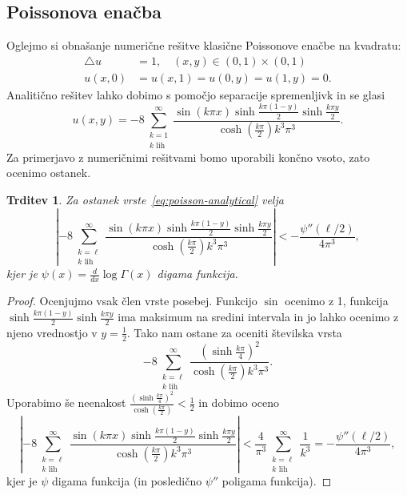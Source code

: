 \documentclass[12pt,a4paper,twoside]{article}
\theoremstyle{definition} %
\theoremstyle{plain} %
\newtheorem{trditev}[definicija]{Trditev}
\numberwithin{equation}{section}
\newcommand{\lap}{\triangle}
\newcommand{\dd}[2]{\ensuremath{\frac{d #1}{d #2}}}
\newcommand{\ddx}[1]{\dd{#1}{x}}
\begin{document}
\subsection{Poissonova enačba}
Oglejmo si obnašanje numerične rešitve klasične Poissonove enačbe na kvadratu:
\begin{align}
  \lap u &= 1, \quad (x, y) \in (0, 1) \times (0, 1)
  \label{eq:poisson-problem} \\
  u(x, 0) &= u(x, 1) = u(0, y) = u(1, y) = 0. \nonumber
\end{align}
Analitično rešitev lahko dobimo s pomočjo separacije spremenljivk in se glasi
\begin{equation}
  u(x, y) =
  -8 \sum_{\substack{k=1 \\ k \text{ lih}}}^\infty \frac{ \sin (k \pi  x) \sinh
  \frac{k \pi  (1-y)}{2} \sinh \frac{k \pi
y}{2}}{\cosh(\frac{k\pi}{2})k^3 \pi ^3}.
  \label{eq:poisson-analytical}
\end{equation}
Za primerjavo z numeričnimi rešitvami bomo uporabili končno vsoto, zato ocenimo
ostanek.
\begin{trditev}
  Za ostanek vrste~\eqref{eq:poisson-analytical} velja
  \[
    \left|-8 \sum_{\substack{k=\ell \\ k \text{ lih}}}^\infty \frac{ \sin (k \pi  x) \sinh
      \frac{k \pi  (1-y)}{2} \sinh \frac{k \pi y}{2}}{\cosh(\frac{k\pi}{2})k^3
      \pi ^3}\right| < -\frac{\psi''(\ell/2)}{4 \pi^3},
  \]
  kjer je $\psi(x) = \ddx{}\log\Gamma(x)$ digama funkcija.
\end{trditev}
\begin{proof}
Ocenjujmo vsak člen vrste posebej. Funkcijo $\sin$ ocenimo z 1, funkcija
$\sinh \frac{k \pi  (1-y)}{2} \sinh \frac{k \pi y}{2}$ ima maksimum na sredini
intervala in jo lahko ocenimo z njeno vrednostjo v $y = \frac{1}{2}$.
Tako nam ostane za oceniti številska vrsta
\[
    -8 \sum_{\substack{k=\ell \\ k \text{ lih}}}^\infty
    \frac{\left(\sinh\frac{k \pi}{4}\right)^2}{\cosh(\frac{k\pi}{2})k^3
    \pi ^3} .
\]
Uporabimo še neenakost $\frac{\left(\sinh\frac{k
\pi}{4}\right)^2}{\cosh(\frac{k\pi}{2})} < \frac{1}{2}$ in dobimo oceno
\[
\left|-8 \sum_{\substack{k=\ell \\ k \text{ lih}}}^\infty \frac{ \sin (k \pi  x) \sinh
      \frac{k \pi  (1-y)}{2} \sinh \frac{k \pi y}{2}}{\cosh(\frac{k\pi}{2})k^3
      \pi ^3}\right| < \frac{4}{\pi^3} \sum_{\substack{k=\ell \\ k \text{ lih}}}^\infty
      \frac{1}{k^3} = -\frac{\psi''(\ell/2)}{4 \pi^3},
\]
kjer je $\psi$ digama funkcija (in posledično $\psi''$ poligama funkcija).
\end{proof}
\end{document}
